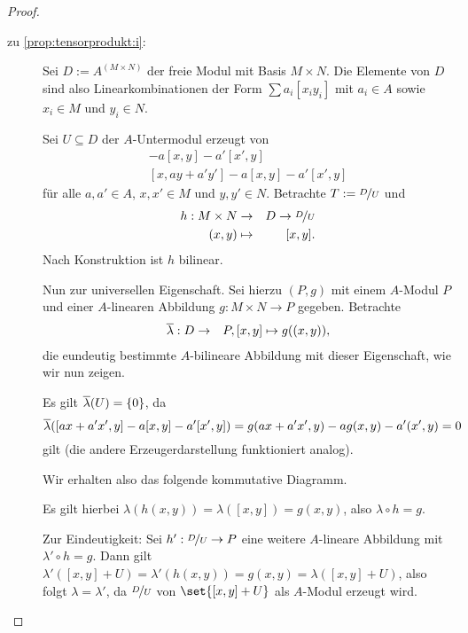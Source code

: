 \documentclass[12pt,a4paper]{scrartcl}
\theoremstyle{cplain}
\theoremstyle{cdef}
\begin{document}
\begin{proof}
	\leavevmode
	\begin{description}
		\item[zu \ref{prop:tensorprodukt:i}:] 
		Sei $D := A^{(M \times N)}$ der freie Modul mit Basis $M \times N$. Die Elemente von $D$ sind also Linearkombinationen der Form $\sum a_i [x_iy_i]$ mit $a_i \in A$ sowie $x_i \in M$ und $y_i \in N$.
		
		Sei $U \subseteq D$ der $A$-Untermodul erzeugt von
		\begin{align*}
			[ax+a'x',y] - a[x,y]-a'[x',y] \\
			[x,ay+a'y'] - a[x,y]-a'[x',y]
		\end{align*}
		für alle $a,a' \in A$, $x,x' \in M$ und $y,y' \in N$. Betrachte $T := \nicefrac{D}{U}$ und
		\begin{eqnarray*}
			h:M \times N &\to& D \to \nicefrac{D}{U} \\
			(x,y) &\mapsto& [x,y].
		\end{eqnarray*}
		Nach Konstruktion ist $h$ bilinear.
		
		Nun zur universellen Eigenschaft. Sei hierzu $(P,g)$ mit einem $A$-Modul $P$ und einer $A$-linearen Abbildung $g: M \times N \to P$ gegeben. Betrachte
		\begin{eqnarray*}
			\overline \lambda : D &\to& P,
			[x,y]\mapsto g((x,y)),
		\end{eqnarray*}
		die eundeutig bestimmte $A$-bilineare Abbildung mit dieser Eigenschaft, wie wir nun zeigen.

		Es gilt $\overline \lambda (U) = \{0\}$, da \[ \overline\lambda ([ax+a'x',y]-a[x,y]-a'[x',y]) = g(ax+a'x',y)-ag(x,y)-a'(x',y) = 0 \]
		gilt (die andere Erzeugerdarstellung funktioniert analog).

		Wir erhalten also das folgende kommutative Diagramm.
		\begin{figure}[H]
			\centering
		\end{figure}
		Es gilt hierbei $\lambda(h(x,y)) = \lambda([x,y]) = g(x,y)$, also $\lambda \circ h = g$.

		Zur Eindeutigkeit: Sei $h': \nicefrac{D}{U} \to P$ eine weitere $A$-lineare Abbildung mit $\lambda' \circ h = g$. Dann gilt $\lambda'([x,y]+U) = \lambda'(h(x,y)) = g(x,y) = \lambda([x,y]+U)$, also folgt $\lambda = \lambda'$, da $\nicefrac{D}{U}$ von $\set{[x,y]+U}$ als $A$-Modul erzeugt wird.


\end{description}
\end{proof}
\end{document}
